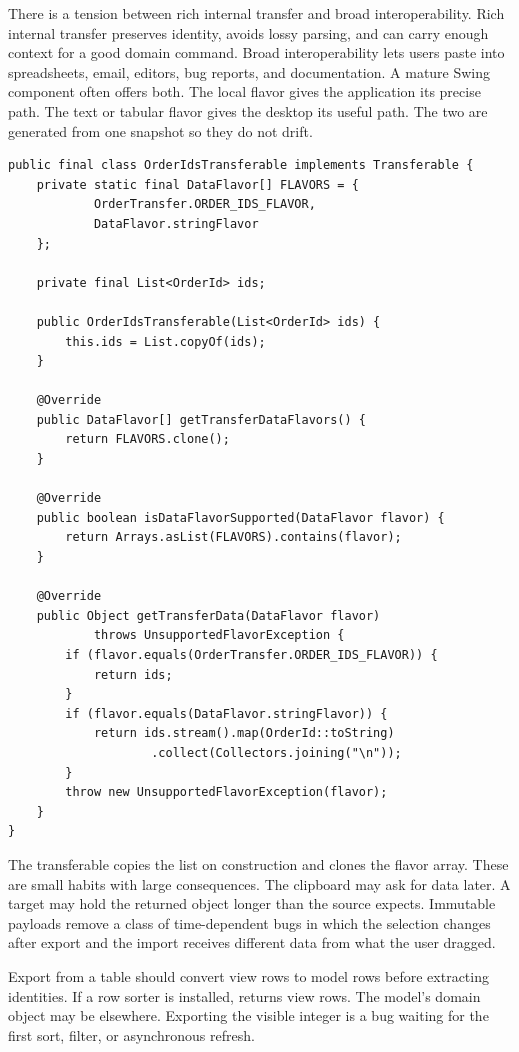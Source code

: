 There is a tension between rich internal transfer and broad interoperability. Rich internal transfer preserves identity, avoids lossy parsing, and can carry enough context for a good domain command. Broad interoperability lets users paste into spreadsheets, email, editors, bug reports, and documentation. A mature Swing component often offers both. The local flavor gives the application its precise path. The text or tabular flavor gives the desktop its useful path. The two are generated from one snapshot so they do not drift.

\begin{lstlisting}[caption={A Transferable offering local IDs and plain text.}]
public final class OrderIdsTransferable implements Transferable {
    private static final DataFlavor[] FLAVORS = {
            OrderTransfer.ORDER_IDS_FLAVOR,
            DataFlavor.stringFlavor
    };

    private final List<OrderId> ids;

    public OrderIdsTransferable(List<OrderId> ids) {
        this.ids = List.copyOf(ids);
    }

    @Override
    public DataFlavor[] getTransferDataFlavors() {
        return FLAVORS.clone();
    }

    @Override
    public boolean isDataFlavorSupported(DataFlavor flavor) {
        return Arrays.asList(FLAVORS).contains(flavor);
    }

    @Override
    public Object getTransferData(DataFlavor flavor)
            throws UnsupportedFlavorException {
        if (flavor.equals(OrderTransfer.ORDER_IDS_FLAVOR)) {
            return ids;
        }
        if (flavor.equals(DataFlavor.stringFlavor)) {
            return ids.stream().map(OrderId::toString)
                    .collect(Collectors.joining("\n"));
        }
        throw new UnsupportedFlavorException(flavor);
    }
}
\end{lstlisting}

The transferable copies the list on construction and clones the flavor array. These are small habits with large consequences. The clipboard may ask for data later. A target may hold the returned object longer than the source expects. Immutable payloads remove a class of time-dependent bugs in which the selection changes after export and the import receives different data from what the user dragged.

Export from a table should convert view rows to model rows before extracting identities. If a row sorter is installed,  returns view rows. The model's domain object may be elsewhere. Exporting the visible integer is a bug waiting for the first sort, filter, or asynchronous refresh.

